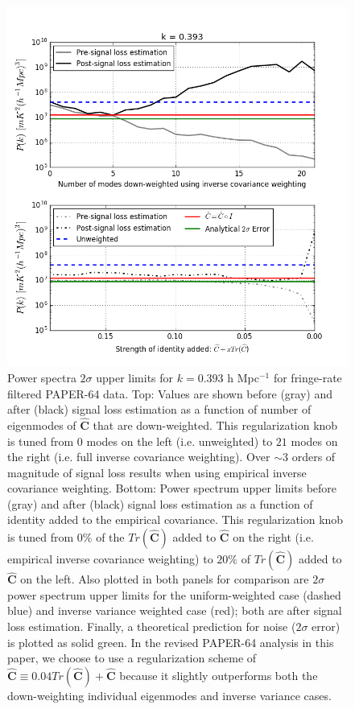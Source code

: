 \documentclass[preprint2,numberedappendix,tighten]{aastex6}  %
\begin{document}
\begin{figure}
	\centering
	\includegraphics[width=1\textwidth]{plots/sigloss_modeloop_2panel.png}
	\caption{Power spectra $2\sigma$ upper limits for $k=0.393$ h Mpc$^{-1}$ for fringe-rate filtered PAPER-64 data. Top: Values 
are shown before (gray) and after (black) signal loss estimation as a function of number of eigenmodes of $\widehat{\textbf{C}}$ that 
are down-weighted. This regularization knob is tuned from $0$ modes on the left (i.e. unweighted) to $21$ modes on the right (i.e. full inverse 
covariance weighting). Over $\sim3$ orders of magnitude of signal loss results when using empirical inverse covariance weighting. Bottom: Power spectrum upper limits before (gray) and after (black) signal loss estimation as a function of identity added to the empirical covariance. This regularization knob is tuned from $0\%$  of the $Tr(\widehat{\textbf{C}})$ added to $\widehat{\textbf{C}}$ on the right (i.e. empirical inverse covariance weighting) to $20\%$ of $Tr(\widehat{\textbf{C}})$ added to $\widehat{\textbf{C}}$ on the left. Also 
plotted in both panels for comparison are $2\sigma$ power spectrum upper limits for the uniform-weighted case (dashed blue) and inverse variance 
weighted case (red); both are after signal loss estimation. Finally, a theoretical prediction for noise ($2\sigma$ error) is plotted 
as solid green. In the revised PAPER-64 analysis in this paper, we choose to use a regularization scheme of $\widehat{\textbf{C}} \equiv 0.04Tr(\widehat{\textbf{C}}) + \widehat{\textbf{C}}$ because it slightly outperforms both the down-weighting individual eigenmodes and inverse variance cases.}
	\label{fig:sigloss_modeloop}
\end{figure}
\end{document}
